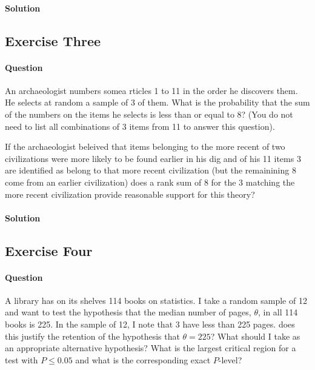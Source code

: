 \documentclass[]{article}
\let\oldparagraph\paragraph
\renewcommand{\paragraph}[1]{\oldparagraph{#1}\mbox{}}
\begin{document}
\paragraph{Solution}\label{solution-1}

\subsection{Exercise Three}\label{exercise-three}

\paragraph{Question}\label{question-2}

An archaeologist numbers somea rticles 1 to 11 in the order he discovers
them. He selects at random a sample of 3 of them. What is the
probability that the sum of the numbers on the items he selects is less
than or equal to 8? (You do not need to list all combinations of 3 items
from 11 to answer this question).

If the archaeologist beleived that items belonging to the more recent of
two civilizations were more likely to be found earlier in his dig and of
his 11 items 3 are identified as belong to that more recent civilization
(but the remainining 8 come from an earlier civilization) does a rank
sum of 8 for the 3 matching the more recent civilization provide
reasonable support for this theory?

\paragraph{Solution}\label{solution-2}

\subsection{Exercise Four}\label{exercise-four}

\paragraph{Question}\label{question-3}

A library has on its shelves 114 books on statistics. I take a random
sample of 12 and want to test the hypothesis that the median number of
pages, \(\theta\), in all 114 books is 225. In the sample of 12, I note
that 3 have less than 225 pages. does this justify the retention of the
hypothesis that \(\theta = 225\)? What should I take as an appropriate
alternative hypothesis? What is the largest critical region for a test
with \(P \leq 0.05\) and what is the corresponding exact \(P\)-level?
\end{document}
